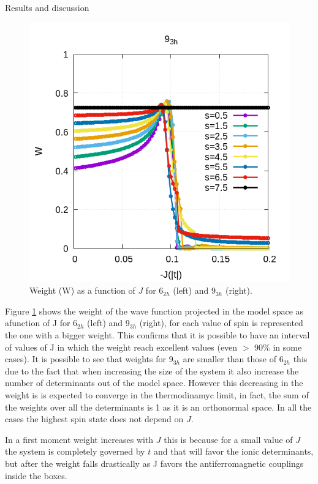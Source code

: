 \documentclass[12pt,twoside]{report}
\begin{document}
\begin{chapter}{Results and discussion}
\begin{figure}[ht]
\begin{minipage}{0.4\textwidth}
			\includegraphics[scale=0.4]{W_vs_J_sites_3-xrep-0.png}
		\end{minipage}
		\caption{\label{fig_w69} Weight (W) as a function of $J$ for 6$_{2h}$ (left) and 9$_{3h}$ (right). }
	\end{figure}
	Figure \ref{fig_w69} shows the weight of the wave function projected in the model space as afunction of J for 6$_{2h}$ (left) and 9$_{3h}$ (right), for each value of spin is represented the one with a bigger weight. This confirms that it is possible to have an interval of values of J in which the weight reach excellent values (even $>$ 90$\%$ in some cases). It is possible to see that weights for 9$_{3h}$ are smaller than those of 6$_{2h}$ this due to the fact that when increasing the size of the system it also increase the number of determinants out of the model space. However this decreasing in the weight is is expected to converge in the thermodinamyc limit, in fact, the sum of the weights over all the determinants is 1 as it is an orthonormal space. In all the cases the highest spin state does not depend on $J$.
	 
	 In a first moment weight increases with $J$ this is because for a small value of $J$ the system is completely governed by $t$ and that will favor the ionic determinants, but after the weight falls drastically as J favors the antiferromagnetic couplings inside the boxes.
	

\end{chapter}
\end{document}
